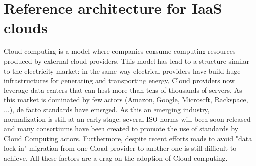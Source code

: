 \section{Reference architecture for IaaS clouds}
\label{sec:moreno}

Cloud computing is a model where companies consume computing resources produced 
by external cloud providers. This model has lead to a structure similar to the 
electricity market: in the same way electrical providers have build huge 
infrastructures for generating and transporting energy, Cloud providers now 
leverage data-centers that can host more than tens of thousands of servers. As 
this market is dominated by few actors (Amazon, Google, Microsoft, Rackspace, 
...), de facto standards have emerged. As this an emerging industry, 
normalization is still at an early stage: several ISO norms will been soon 
released and many consortiums have been created to promote the use of standards 
by Cloud Computing actors. Furthermore, despite recent efforts made to avoid 
"data lock-in" migration from one Cloud provider to another one is still 
difficult to achieve. All these factors are a drag on the adoption of Cloud 
computing.

